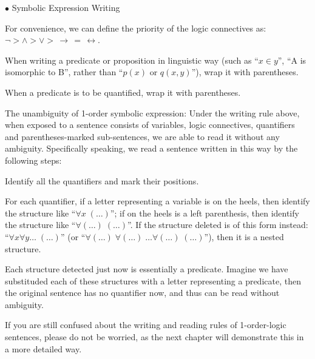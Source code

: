 \documentclass{article}
\begin{document}
\begin{Spec}{$\bullet$ Symbolic Expression Writing}
    \begin{compactitem}
        \item \textcolor{Df}{For convenience, we can define the priority of the logic connectives as: $\lnot>\land>\lor>\,\rightarrow\,=\,\leftrightarrow$.}
        \item When writing a predicate or proposition in linguistic way (such as ``$x\in y$'', ``A is isomorphic to B'', rather than ``$p(x)$ or $q(x,y)$''), wrap it with parentheses.
        \item When a predicate is to be quantified, wrap it with parentheses.
        \item \textcolor{Tr}{The unambiguity of 1-order symbolic expression: Under the writing rule above, when exposed to a sentence consists of variables, logic connectives, quantifiers and parentheses-marked sub-sentences, we are able to read it without any ambiguity. Specifically speaking, we read a sentence written in this way by the following steps:
        \begin{compactenum}
            \item Identify all the quantifiers and mark their positions.
            \item For each quantifier, if a letter representing a variable is on the heels, then identify the structure like ``$\forall x\; (\dots)$''; if on the heels is a left parenthesis, then identify the structure like ``$\forall (\dots)\; (\dots)$''. If the structure deleted is of this form instead: ``$\forall x \forall y \dots \;(\dots)$'' (or ``$\forall (\dots)\; \forall (\dots)\; \dots \forall (\dots)\; (\dots)$''), then it is a nested structure.
            \item Each structure detected just now is essentially a predicate. Imagine we have substituded each of these structures with a letter representing a predicate, then the original sentence has no quantifier now, and thus can be read without ambiguity. 
        \end{compactenum}
        }
        \item If you are still confused about the writing and reading rules of 1-order-logic sentences, please do not be worried, as the next chapter will demonstrate this in a more detailed way.
    \end{compactitem}
\end{Spec}
\end{document}
